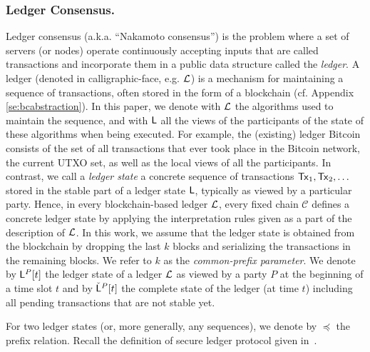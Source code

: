 \subsubsection{Ledger Consensus.}
Ledger consensus (a.k.a. ``Nakamoto consensus'') is the problem where a set of servers
(or nodes) operate continuously accepting inputs
that are called transactions and incorporate them in a public data 
structure called the {\em ledger}. 
A ledger (denoted in calligraphic-face, e.g. $\mathcal{L}$) is a mechanism for maintaining a sequence of transactions, often
stored in the form of a blockchain (cf. Appendix \ref{se:bcabstraction}). In this paper, we denote with $\mathcal{L}$ 
the algorithms used to maintain the sequence, and with $\mathsf{L}$ all the views of the
participants of the state of these algorithms when being executed. For example, the (existing) ledger Bitcoin
consists of the set of all transactions that ever took place in the Bitcoin network, the current UTXO set, as
well as the local views of all the participants.
In contrast, we call a \emph{ledger state} a concrete sequence of transactions $\mathsf{Tx}_1,\mathsf{Tx}_2,\dots$ stored in the stable
part of a ledger state $\mathsf{L}$, typically as viewed by a particular party. Hence, in every blockchain-based ledger $\mathcal{L}$,
every fixed chain $\mathcal{C}$ defines a concrete ledger state by applying the interpretation rules given as a part of the
description of $\mathcal{L}$. In this work, we assume that the ledger state is obtained from the blockchain by dropping the last $k$ blocks
and serializing the transactions in the remaining blocks. We refer to $k$ as the \emph{common-prefix parameter}.
We denote by $\mathsf{L}^P[t]$ the ledger state of a ledger $\mathcal{L}$ as viewed by a party $P$ at the beginning of a time slot $t$
and by ${\check {\mathsf{L}}}^{P}[t]$ the complete state of the ledger (at time $t$) including all pending transactions that are not stable yet. 


For two ledger states (or, more generally, any sequences), we denote by $\preceq$ the prefix relation.
Recall the definition of secure ledger protocol given in~\cite{sok}.


